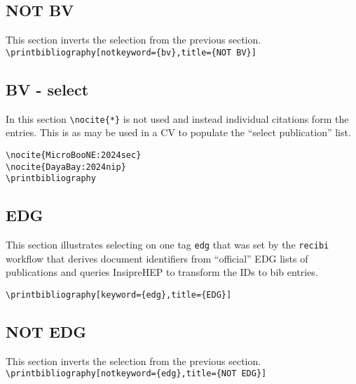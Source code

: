 \documentclass{article}
\begin{document}
\begin{refsection}
\section{NOT BV}
This section inverts the selection from the previous section.
\nocite{*}
\noindent \verb|\printbibliography[notkeyword={bv},title={NOT BV}]|
\printbibliography[notkeyword={bv},title={NOT BV}]
\end{refsection}


\begin{refsection}
\section{BV - select}
In this section \verb|\nocite{*}| is not used and instead individual citations form the entries.  This is as may be used in a CV to populate the ``select publication'' list.

\begin{verbatim}
\nocite{MicroBooNE:2024sec}
\nocite{DayaBay:2024nip}
\printbibliography
\end{verbatim}

\nocite{MicroBooNE:2024sec}
\nocite{DayaBay:2024nip}
\printbibliography
\end{refsection}


\begin{refsection}
\section{EDG}
This section illustrates selecting on one tag \texttt{edg} that was set by the \texttt{recibi} workflow that derives document identifiers from ``official'' EDG lists of publications and queries InsipreHEP to transform the IDs to bib entries.

\nocite{*}
\noindent \verb|\printbibliography[keyword={edg},title={EDG}]|
\printbibliography[keyword={edg},title={EDG}]
\end{refsection}


\begin{refsection}
\section{NOT EDG}
This section inverts the selection from the previous section.
\nocite{*}
\noindent \verb|\printbibliography[notkeyword={edg},title={NOT EDG}]|
\printbibliography[notkeyword={edg},title={NOT EDG}]
\end{refsection}
\end{document}
